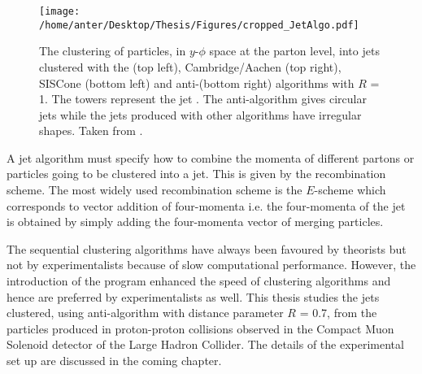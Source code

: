 \begin{figure}[!h]
\begin{center}
\hspace*{-15mm}
\texttt{[image: /home/anter/Desktop/Thesis/Figures/cropped\_JetAlgo.pdf]}\\
\vspace*{4mm}
\caption[The clustering of particles into jets using different jet algorithms.]{The clustering of particles, in $y$-$\phi$ space at the parton level, into jets clustered with the \kt (top left), Cambridge/Aachen (top right), SISCone (bottom left) and anti-\kt (bottom right) algorithms with $R$ = 1. The towers represent the jet \pt. The anti-\kt algorithm gives circular jets while the jets produced with other algorithms have irregular shapes. Taken from \cite{Salam:2009jx}.}
\label{fig:jet_algo}
\end{center}
\end{figure}

A jet algorithm must specify how to combine the momenta of different partons or particles going to be clustered into a jet. This is given by the recombination scheme. The most widely used recombination scheme is the $E$-scheme \cite{Blazey:2000qt} which corresponds to vector addition of four-momenta i.e. the four-momenta of the jet is obtained by simply adding the four-momenta vector of merging particles.
 
The sequential clustering algorithms have always been favoured by theorists but not by experimentalists because of slow computational performance. However, the introduction of the \fastjet program \cite{Cacciari:2011ma} enhanced the speed of clustering algorithms and hence are preferred by experimentalists as well. This thesis studies the jets clustered, using anti-\kt algorithm with distance parameter $R$ = 0.7, from the particles produced in proton-proton collisions observed in the Compact Muon Solenoid detector of the Large Hadron Collider. The details of the experimental set up are discussed in the coming chapter.
